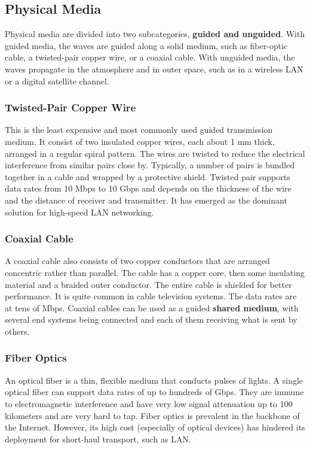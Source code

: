 \subsection{Physical Media}
Physical media are divided into two subcategories, \textbf{guided and unguided}. With guided media, the waves are guided along a solid medium, such as fiber-optic cable, a twisted-pair copper wire, or a coaxial cable. With unguided media, the waves propagate in the atmosphere and in outer space, such as in a wireless LAN or a digital satellite channel.

\subsubsection{Twisted-Pair Copper Wire}
This is the least expensive and most commonly used guided transmission medium. It consist of two insulated copper wires, each about 1 mm thick, arranged in a regular spiral pattern. The wires are twisted to reduce the electrical interference from similar pairs close by. Typically, a number of pairs is bundled together in a cable and wrapped by a protective shield. Twisted pair supports data rates from 10 Mbps to 10 Gbps and depends on the thickness of the wire and the distance of receiver and transmitter. It has emerged as the dominant solution for high-speed LAN networking.

\subsubsection{Coaxial Cable}
A coaxial cable also consists of two copper conductors that are arranged concentric rather than parallel. The cable has a copper core, then some insulating material and a braided outer conductor. The entire cable is shielded for better performance. It is quite common in cable television systems. The data rates are at tens of Mbps. Coaxial cables can be used as a guided \textbf{shared medium}, with several end systems being connected and each of them receiving what is sent by others.

\subsubsection{Fiber Optics}
An optical fiber is a thin, flexible medium that conducts pulses of lights. A single optical fiber can support data rates of up to hundreds of Gbps. They are immune to electromagnetic interference and have very low signal attenuation up to 100 kilometers and are very hard to tap. Fiber optics is prevalent in the backbone of the Internet. However, its high cost (especially of optical devices) has hindered its deployment for short-haul transport, such as LAN.

